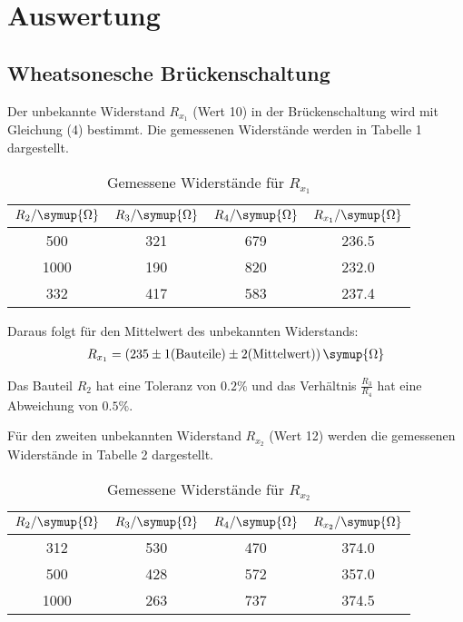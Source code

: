 \section{Auswertung}
\label{sec:Auswertung}

\subsection{Wheatsonesche Brückenschaltung}
Der unbekannte Widerstand $R_{x_1}$ (Wert 10) in der Brückenschaltung wird mit Gleichung (4) bestimmt. Die gemessenen Widerstände
werden in Tabelle 1 dargestellt.

\begin{table}[H]
  \centering
  \caption{Gemessene Widerstände für $R_{x_1}$}
  \label{tab:Widerstand}
  \begin{tabular}{c c c c}
    \toprule
    $R_2/ \symup{\Omega}$ & $R_3/ \symup{\Omega}$ & $R_4 / \symup{\Omega}$ & $R_{x_1}/ \symup{\Omega}$\\
    \midrule
     500  &  321 & 679  &  236.5 \\
    1000  &  190 & 820  &  232.0  \\
     332  &  417 & 583  &  237.4  \\
    \bottomrule
  \end{tabular}
\end{table}

Daraus folgt für den Mittelwert  des unbekannten Widerstands:
\begin{align*}
  R_{x_1} = (235 \pm 1\text{(Bauteile)} \pm 2\text{(Mittelwert)}) \, \symup{\Omega}
\end{align*}

Das Bauteil $R_2$ hat eine Toleranz von $0.2\%$ und das Verhältnis $\frac{R_3}{R_4}$ hat eine Abweichung von
$0.5\%$.

Für den zweiten unbekannten Widerstand $R_{x_2}$ (Wert 12) werden die gemessenen Widerstände in Tabelle 2 dargestellt.

\begin{table}[H]
  \centering
  \caption{Gemessene Widerstände für $R_{x_2}$}
  \label{tab:Widerstand}
  \begin{tabular}{c c c c}
    \toprule
    $R_2/ \symup{\Omega}$ & $R_3/ \symup{\Omega}$ & $R_4 / \symup{\Omega}$ & $R_{x_2}/ \symup{\Omega}$ \\
    \midrule
      312  &  530 & 470 & 374.0 \\
      500  &  428 & 572 & 357.0  \\
     1000  &  263 & 737 & 374.5  \\
    \bottomrule
  \end{tabular}
\end{table}

